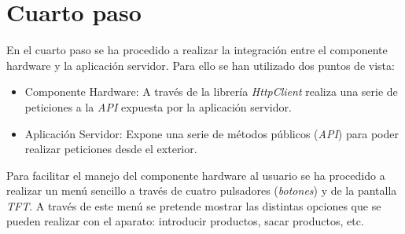\section{Cuarto paso}

En el cuarto paso se ha procedido a realizar la integración entre el componente hardware y la aplicación servidor. Para ello se han utilizado dos puntos de vista:

\begin{itemize}
    \item Componente Hardware: A través de la librería \emph{HttpClient} realiza una serie de peticiones a la \emph{API} expuesta por la aplicación servidor.
    \item Aplicación Servidor: Expone una serie de métodos públicos (\emph{API}) para poder realizar peticiones desde el exterior.
\end{itemize}

Para facilitar el manejo del componente hardware al usuario se ha procedido a realizar un menú sencillo a través de cuatro pulsadores (\emph{botones}) y de la pantalla \emph{TFT}. A través de este menú se pretende mostrar las distintas opciones que se pueden realizar con el aparato: introducir productos, sacar productos, etc.